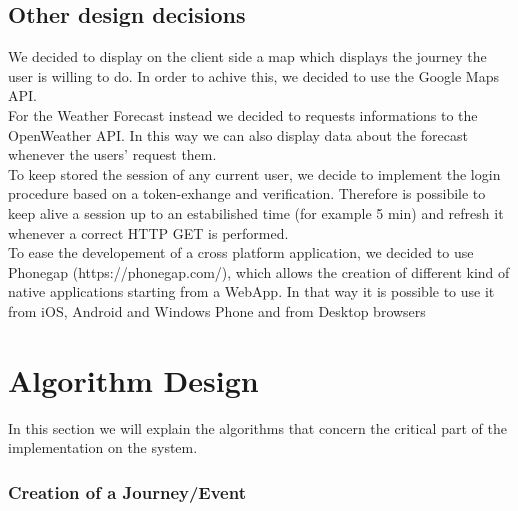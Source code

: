 \documentclass[numbers=noenddot, 12pt, a4paper, oneside]{scrbook}
\begin{document}
\section{Other design decisions}

We decided to display on the client side a map which displays the journey the user is willing to do. In order to achive this, we decided to use the Google Maps API.\\

For the Weather Forecast instead we decided to requests informations to the OpenWeather API. In this way we can also display data about the forecast whenever the users' request them.\\

To keep stored the session of any current user, we decide to implement the login procedure based on a token-exhange and verification. Therefore is possibile to keep alive a session up to an estabilished time (for example 5 min) and refresh it whenever a correct HTTP GET is performed.\\

To ease the developement of a cross platform application, we decided to use Phonegap (https://phonegap.com/), which allows the creation of different kind of native applications starting from a WebApp. In that way it is possible to use it from iOS, Android and Windows Phone and from Desktop browsers


\chapter{Algorithm Design}

In this section we will explain the algorithms that concern the critical part of the implementation on the system.

\subsection*{Creation of a Journey/Event}
\end{document}
